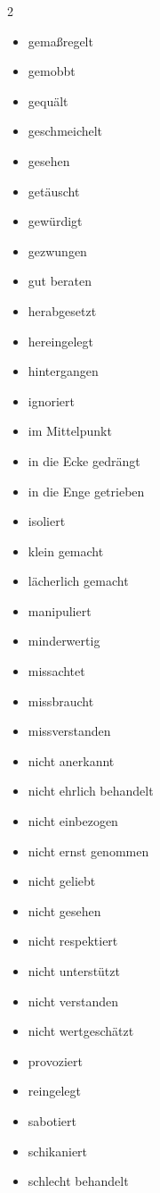 \begin{multicols}{2}
\begin{itemize}
        \item gemaßregelt
        \item gemobbt
        \item gequält
        \item geschmeichelt
        \item gesehen
        \item getäuscht
        \item gewürdigt
        \item gezwungen
        \item gut beraten
        \item herabgesetzt
        \item hereingelegt
        \item hintergangen
        \item ignoriert
        \item im Mittelpunkt
        \item in die Ecke gedrängt
        \item in die Enge getrieben
        \item isoliert
        \item klein gemacht
        \item lächerlich gemacht
        \item manipuliert
        \item minderwertig
        \item missachtet
        \item missbraucht
        \item missverstanden
        \item nicht anerkannt
        \item nicht ehrlich behandelt
        \item nicht einbezogen
        \item nicht ernst genommen
        \item nicht geliebt
        \item nicht gesehen
        \item nicht respektiert
        \item nicht unterstützt
        \item nicht verstanden
        \item nicht wertgeschätzt
        \item provoziert
        \item reingelegt
        \item sabotiert
        \item schikaniert
        \item schlecht behandelt

\end{itemize}
\end{multicols}
